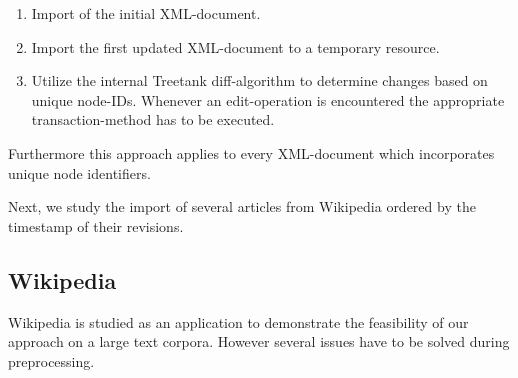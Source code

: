 \begin{enumerate}
\item Import of the initial XML-document.
\item Import the first updated XML-document to a temporary resource.
\item Utilize the internal Treetank diff-algorithm to determine changes based on unique node-IDs. Whenever an edit-operation is encountered the appropriate transaction-method has to be executed. %
\end{enumerate}


Furthermore this approach applies to every XML-document which incorporates unique node identifiers.

Next, we study the import of several articles from Wikipedia ordered by the timestamp of their revisions. 

\subsection{Wikipedia}
Wikipedia is studied as an application to demonstrate the feasibility of our approach on a large text corpora. However several issues have to be solved during preprocessing.

